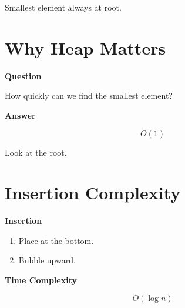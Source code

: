 \documentclass[11pt,a4paper]{book}
\begin{document}
Smallest element always at root.
\section{Why Heap Matters}

\textcolor{RosettaBlue}{\textbf{Question}}

How quickly can we find the smallest element?

\bigskip

\textcolor{RosettaDeepGreen}{\textbf{Answer}}

\[
\boxed{O(1)}
\]

\begin{center}
Look at the root.
\end{center}
\section{Insertion Complexity}

\textcolor{RosettaBlue}{\textbf{Insertion}}

\begin{enumerate}[leftmargin=2em]
    \item Place at the bottom.
    \item Bubble upward.
\end{enumerate}

\medskip

\textcolor{RosettaDeepGreen}{\textbf{Time Complexity}}

\[
\boxed{O(\log n)}
\]











\end{document}
